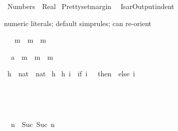 %
\begin{isabellebody}%
\def\isabellecontext{Numbers}%
\isanewline
{}\ Numbers\ {\isacharequal}\ Real{\isacharcolon}\isanewline
\isanewline
{}\ {\isachardoublequote}Pretty{\isachardot}setmargin\ {}{}{\isachardoublequote}\isanewline
{}\ {\isachardoublequote}IsarOutput{\isachardot}indent\ {\isacharcolon}{\isacharequal}\ {}{\isachardoublequote}%
\begin{isamarkuptext}%
numeric literals; default simprules; can re-orient%
\end{isamarkuptext}%
\ {\isachardoublequote}{\isacharhash}{}\ {\isacharasterisk}\ m\ {\isacharequal}\ m\ {\isacharplus}\ m{\isachardoublequote}%
\begin{isamarkuptxt}%
\begin{isabelle}%
\ {}{\isachardot}\ {\isacharparenleft}{\isacharhash}{}{\isasymColon}{\isacharprime}a{\isacharparenright}\ {\isacharasterisk}\ m\ {\isacharequal}\ m\ {\isacharplus}\ m%
\end{isabelle}%
\end{isamarkuptxt}%
\isanewline
\isanewline
{}\ h\ {\isacharcolon}{\isacharcolon}\ {\isachardoublequote}nat\ {\isasymRightarrow}\ nat{\isachardoublequote}\isanewline
{}\ h\ {\isachardoublequote}{\isacharbraceleft}{\isacharbraceright}{\isachardoublequote}\isanewline
{\isachardoublequote}h\ i\ {\isacharequal}\ {\isacharparenleft}if\ i\ {\isacharequal}\ {\isacharhash}{}\ then\ {\isacharhash}{}\ else\ i{\isacharparenright}{\isachardoublequote}%
\begin{isamarkuptext}%
%
\end{isamarkuptext}%
%
\begin{isamarkuptext}%
\begin{isabelle}%
{\isacharhash}{}\ {\isacharequal}\ {}%
\end{isabelle}

\begin{isabelle}%
{\isacharhash}{}\ {\isacharequal}\ {}%
\end{isabelle}

\begin{isabelle}%
{\isacharhash}{}\ {\isacharplus}\ n\ {\isacharequal}\ Suc\ {\isacharparenleft}Suc\ n{\isacharparenright}%
\end{isabelle}


\end{isamarkuptext}
\end{isabellebody}
